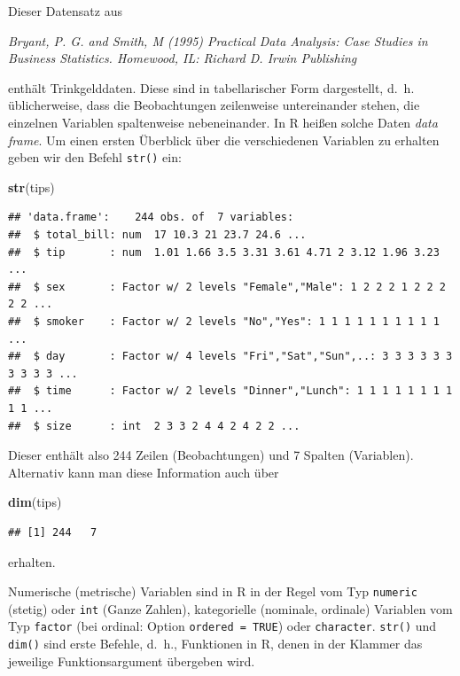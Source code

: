 \documentclass[12pt,ngerman,paper=a4,pagesize,DIV=13]{scrreprt}
\newenvironment{Shaded}{\begin{snugshade}}{\end{snugshade}}
\newcommand{\KeywordTok}[1]{\textcolor[rgb]{0.13,0.29,0.53}{\textbf{#1}}}
\newcommand{\NormalTok}[1]{#1}
\begin{document}
Dieser Datensatz aus

\emph{Bryant, P. G. and Smith, M (1995) Practical Data Analysis: Case
Studies in Business Statistics. Homewood, IL: Richard D. Irwin
Publishing}

enthält Trinkgelddaten. Diese sind in tabellarischer Form dargestellt,
d.~h. üblicherweise, dass die Beobachtungen zeilenweise untereinander
stehen, die einzelnen Variablen spaltenweise nebeneinander. In R heißen
solche Daten \emph{data frame}. Um einen ersten Überblick über die
verschiedenen Variablen zu erhalten geben wir den Befehl \texttt{str()}
ein:

\begin{Shaded}
\begin{Highlighting}[]
\KeywordTok{str}\NormalTok{(tips)}
\end{Highlighting}
\end{Shaded}

\begin{verbatim}
## 'data.frame':    244 obs. of  7 variables:
##  $ total_bill: num  17 10.3 21 23.7 24.6 ...
##  $ tip       : num  1.01 1.66 3.5 3.31 3.61 4.71 2 3.12 1.96 3.23 ...
##  $ sex       : Factor w/ 2 levels "Female","Male": 1 2 2 2 1 2 2 2 2 2 ...
##  $ smoker    : Factor w/ 2 levels "No","Yes": 1 1 1 1 1 1 1 1 1 1 ...
##  $ day       : Factor w/ 4 levels "Fri","Sat","Sun",..: 3 3 3 3 3 3 3 3 3 3 ...
##  $ time      : Factor w/ 2 levels "Dinner","Lunch": 1 1 1 1 1 1 1 1 1 1 ...
##  $ size      : int  2 3 3 2 4 4 2 4 2 2 ...
\end{verbatim}

Dieser enthält also 244 Zeilen (Beobachtungen) und 7 Spalten
(Variablen). Alternativ kann man diese Information auch über

\begin{Shaded}
\begin{Highlighting}[]
\KeywordTok{dim}\NormalTok{(tips)}
\end{Highlighting}
\end{Shaded}

\begin{verbatim}
## [1] 244   7
\end{verbatim}

erhalten.

Numerische (metrische) Variablen sind in R in der Regel vom Typ
\texttt{numeric} (stetig) oder \texttt{int} (Ganze Zahlen), kategorielle
(nominale, ordinale) Variablen vom Typ \texttt{factor} (bei ordinal:
Option \texttt{ordered\ =\ TRUE}) oder \texttt{character}.
\texttt{str()} und \texttt{dim()} sind erste Befehle, d.~h., Funktionen
in R, denen in der Klammer das jeweilige Funktionsargument übergeben
wird.
\end{document}
